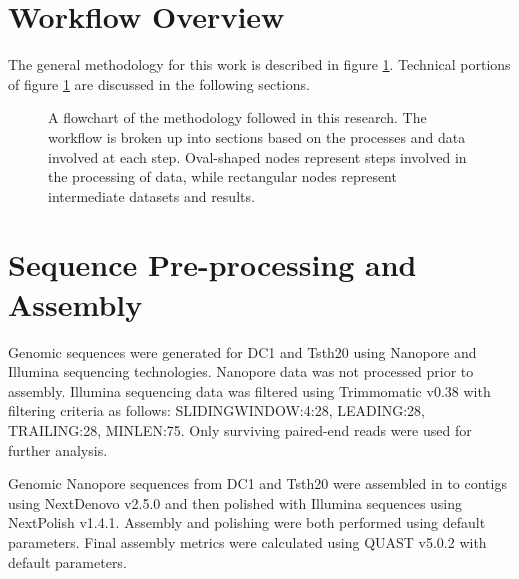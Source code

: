 \section{Workflow Overview}

The general methodology for this work is described in figure
\ref{fig:workflow}. Technical portions of figure \ref{fig:workflow}
are discussed in the following sections.

\begin{figure}
  \centering
  \caption{A flowchart of the methodology followed in this
    research. The workflow is broken up into sections based on the
    processes and data involved at each step. Oval-shaped nodes
    represent steps involved in the processing of data, while
    rectangular nodes represent intermediate datasets and results.}
  \label{fig:workflow}
\end{figure}


\section{Sequence Pre-processing and Assembly}

Genomic sequences were generated for DC1 and Tsth20 using
Nanopore\cite{Wang2021} and Illumina\cite{Bennett2004} sequencing
technologies. Nanopore data was not processed prior to
assembly. Illumina sequencing data was filtered using Trimmomatic
v0.38\cite{Bolger2014} with filtering criteria as follows:
SLIDINGWINDOW:4:28, LEADING:28, TRAILING:28, MINLEN:75. Only surviving
paired-end reads were used for further analysis.

Genomic Nanopore sequences from DC1 and Tsth20 were assembled in to
contigs using NextDenovo\cite{Hu2024} v2.5.0 and then polished with
Illumina sequences using NextPolish\cite{Hu2020} v1.4.1. Assembly and
polishing were both performed using default parameters. Final assembly
metrics were calculated using QUAST v5.0.2\cite{Gurevich2013} with
default parameters.

